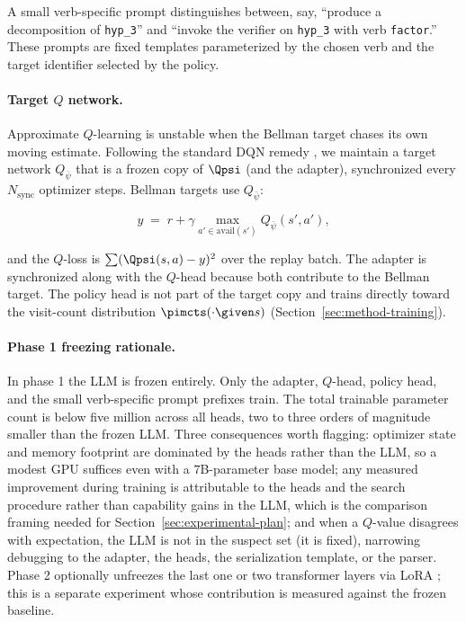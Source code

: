A small verb-specific prompt distinguishes between, say, ``produce a
decomposition of \texttt{hyp\_3}'' and ``invoke the verifier on
\texttt{hyp\_3} with verb \texttt{factor}.'' These prompts are fixed
templates parameterized by the chosen verb and the target identifier
selected by the policy.

\paragraph{Target $Q$ network.}
Approximate $Q$-learning is unstable when the Bellman target chases
its own moving estimate. Following the standard DQN remedy
\citep{mnih2015human}, we maintain a target network $Q_{\bar{\psi}}$
that is a frozen copy of $\Qpsi$ (and the adapter), synchronized
every $N_{\mathrm{sync}}$ optimizer steps. Bellman targets use $Q_{\bar{\psi}}$:

\begin{equation}
\label{eq:bellmantarget}
y \;=\; r + \gamma \max_{a' \in \mathrm{avail}(s')} Q_{\bar{\psi}}(s', a'),
\end{equation}

and the $Q$-loss is $\sum (\Qpsi(s, a) - y)^{2}$ over the replay
batch. The adapter is synchronized along with the $Q$-head because
both contribute to the Bellman target. The policy head is not part
of the target copy and trains directly toward the visit-count
distribution $\pimcts(\cdot \given s)$
(Section~\ref{sec:method-training}).

\paragraph{Phase 1 freezing rationale.}
In phase 1 the LLM is frozen entirely. Only the adapter, $Q$-head,
policy head, and the small verb-specific prompt prefixes train.
The total trainable parameter count is below five million across all
heads, two to three orders of magnitude smaller than the frozen LLM.
Three consequences worth flagging: optimizer state and memory
footprint are dominated by the heads rather than the LLM, so a
modest GPU suffices even with a $7$B-parameter base model; any
measured improvement during training is attributable to the heads
and the search procedure rather than capability gains in the LLM,
which is the comparison framing needed for
Section~\ref{sec:experimental-plan}; and when a $Q$-value disagrees
with expectation, the LLM is not in the suspect set (it is fixed),
narrowing debugging to the adapter, the heads, the serialization
template, or the parser. Phase 2 optionally unfreezes the last one
or two transformer layers via LoRA \citep{hu2022lora}; this is a
separate experiment whose contribution is measured against the
frozen baseline.

